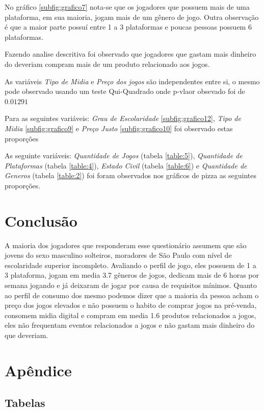 \documentclass[11pt,a4paper]{article}
\begin{document}
No gráfico \ref{subfig:grafico7} nota-se que os jogadores que possuem mais de uma plataforma, em sua maioria, jogam mais de um gênero de jogo. Outra observação é que a maior parte possuí entre 1 a 3 plataformas e poucas pessoas possuem 6 plataformas.

Fazendo analise descritiva foi observado que jogadores que gastam mais dinheiro do deveriam compram mais de um produto relacionado aos jogos.  

As variáveis \textit{Tipo de Midia} e \textit{Preço dos jogos} são independentes entre si, o mesmo pode observado usando um teste Qui-Quadrado onde p-vlaor obsevado foi de $0.01291$

Para as seguintes variáveis: \textit{Grau de Escolaridade } \ref{subfig:grafico12},  \textit{Tipo de Midia} \ref{subfig:grafico9} e \textit{Preço Justo} \ref{subfig:grafico10}  foi observado estas proporções

As seguinte variáveis: \textit{Quantidade de Jogos} (tabela \ref{table:5}), \textit{Quantidade de Plataformas} (tabela \ref{table:4}), \textit{Estado Civil} (tabela \ref{table:6}) e \textit{Quantidade de Generos} (tabela \ref{table:2}) foi foram observados nos gráficos de pizza as seguintes proporções.
 
 
\section{Conclusão}
\indent
A maioria dos jogadores que responderam esse questionário assumem que são jovens do sexo masculino solteiros, moradores de São Paulo com nível de escolaridade superior incompleto. Avaliando o perfil de jogo, eles possuem de 1 a 3 plataforma, jogam em media 3.7 gêneros de jogos, dedicam mais de 6 horas por semana jogando e já deixaram de jogar por causa de requisitos mínimos. Quanto ao perfil de consumo dos mesmo podemos dizer que a maioria da pessoa acham o preço dos jogos elevados e não possuem o habito de comprar jogos na pré-venda, consomem midia digital e compram em media 1.6 produtos relacionados a jogos, eles não frequentam eventos relacionados a jogos e não gastam mais dinheiro do que deveriam.

\section{Apêndice}
\subsection{Tabelas}
\end{document}
